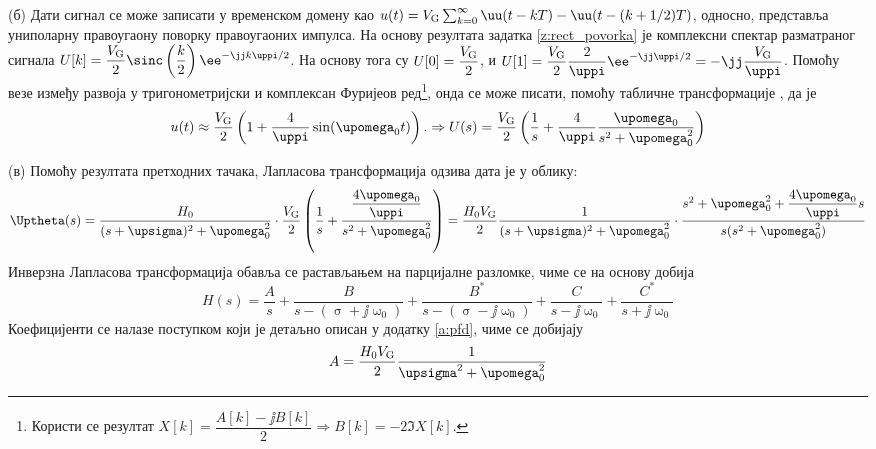 (б) Дати сигнал се може записати у временском домену као 
$u(t) = V_{\rm G} \sum_{k = 0}^{\infty} \uu(t - kT) - \uu(t - (k+1/2)T)$, односно, представља униполарну правоугаону поворку 
правоугаоних импулса. 
На основу резултата задатка \ref{z:rect_povorka} је комплексни спектар разматраног сигнала
$U[k] = \dfrac{V_{\rm G}}{2} \sinc\left(\dfrac{k}{2}\right) \ee^{-\jj k \uppi / 2 } $.
На основу тога су $U[0] = \dfrac{V_{\rm G}}{2}$, и 
$U[1] = \dfrac{V_{\rm G}}{2} \dfrac{2}{\uppi} \ee^{-\jj\uppi/2} = - \jj \dfrac{V_{\rm G}}{\uppi}$.
Помоћу везе између развоја у тригонометријски и комплексан Фуријеов ред\footnote{Користи се 
резултат $X[k] = \dfrac{A[k] - \jj B[k]}{2} \Rightarrow B[k] = -2 \Im{X[k]}$.
}, онда се може писати, помоћу табличне трансформације , да је 
\begin{equation}
    u(t) \approx \dfrac{V_{\rm G}}{2}  
    \left( 1 + \dfrac{4}{\uppi} \sin(\upomega_0 t) \right).
    \Rightarrow
    U(s) = \dfrac{V_{\rm G}}{2}
    \left(
        \dfrac{1}{s} + \dfrac{4}{\uppi} \dfrac{\upomega_0 }{s^2 + \upomega_0^2}
    \right)
\end{equation}

(в) Помоћу резултата претходних тачака, Лапласова трансформација одзива дата је у облику: 
\begin{equation}
    \Uptheta(s) =
    \dfrac{H_0}{(s + \upsigma)^2 + \upomega_0^2}
    \cdot
    \dfrac{V_{\rm G}}{2}
    \left(
        \dfrac{1}{s} + \dfrac{ \dfrac{4\upomega_0}{\uppi}  }{s^2 + \upomega_0^2}
    \right)
    = 
    \dfrac{H_0 V_{\rm G}}{2}
    \dfrac{1}{(s + \upsigma)^2 + \upomega_0^2}
    \cdot
    \dfrac{s^2 + \upomega_0^2 + \dfrac{4\upomega_0}{\uppi}s }{ s(s^2 + \upomega_0^2) }
\end{equation}
Инверзна Лапласова трансформација обавља се растављањем на парцијалне разломке, чиме се на основу добија 
\begin{equation}
    H(s) = \dfrac{A}{s} + \dfrac{B}{ s - (\upsigma + \jj\upomega_0 ) } + \dfrac{B^\ast}{ s - (\upsigma - \jj\upomega_0 ) } 
    + \dfrac{C}{s - \jj\upomega_0} + \dfrac{C^*}{s + \jj\upomega_0}  
\end{equation}
Коефицијенти се налазе поступком који је детаљно описан у додатку \ref{a:pfd}, чиме се добијају
\begin{eqnarray}
    A = \dfrac{H_0 V_{\rm G}}{2} \dfrac{1}{\upsigma^2 + \upomega_0^2}
\end{eqnarray}